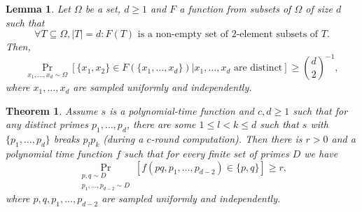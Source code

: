 \documentclass[10pt,a4paper]{amsart}
\newtheorem{lem}{Lemma}
\newtheorem{thm}{Theorem}
\newcommand{\abs}[1]{\lvert #1\rvert}
\begin{document}
\begin{lem}\label{lemmprob}
    Let $\Omega$ be a set, $d\geq 1$ and $F$ a function from subsets of $\Omega$ of size $d$ such that
    \[\forall T\subseteq \Omega, \abs{T}=d: F(T)\text{ is a non-empty set of $2$-element subsets of $T$.} \]
    Then,
    \[\Pr_{x_1,\dots,x_d \sim \Omega}[\{x_1,x_2\} \in F(\{x_1,\dots,x_d\})|x_1,\dots,x_d \text{ are distinct}]\geq \binom{d}{2}^{-1},\]
    where $x_1,\dots,x_d$ are sampled uniformly and independently.
\end{lem}

\begin{thm}\label{thrmmain}
    Assume $s$ is a polynomial-time function and $c,d\geq 1$ such that for any distinct primes $p_1,\dots,p_d$, there are some $1\leq l <k \leq d$ such that $s$ with $\{p_1,\dots,p_d\}$ breaks $p_lp_k$ (during a $c$-round computation). 
    Then there is $r>0$ and a polynomial time function $f$ such that for every finite set of primes $D$ we have
    \[\Pr_{\substack{p,q \sim D\\ p_1,\dots,p_{d-2} \sim D}}  \left[f(pq,p_1,\dots,p_{d-2}) \in \{p,q\}\right]\geq r,\]
    where $p,q,p_1,\dots,p_{d-2}$ are sampled uniformly and independently.
\end{thm}
\end{document}
